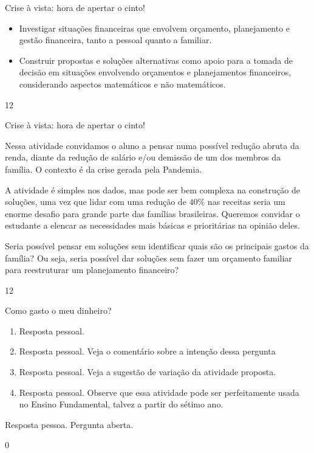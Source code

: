 \begin{objectives}{Crise à vista: hora de apertar o cinto!}
{
\begin{itemize}
\item Investigar situações financeiras que envolvem orçamento, planejamento e gestão financeira, tanto a pessoal quanto a familiar.
\item Construir propostas e soluções alternativas como apoio para a tomada de decisão em situações envolvendo orçamentos e planejamentos financeiros, considerando aspectos matemáticos e não matemáticos. 
\end{itemize}
}{1}{2}
\end{objectives}
\begin{sugestions}{Crise à vista: hora de apertar o cinto!}
{
Nessa atividade convidamos o aluno a pensar numa possível redução abruta da renda, diante da redução de salário e/ou demissão de um dos membros da família. O contexto é da crise gerada pela Pandemia. 

A atividade é simples nos dados, mas pode ser bem complexa na construção de soluções, uma vez que lidar com uma redução de $40\%$ nas receitas seria um enorme desafio para grande parte das famílias brasileiras. Queremos convidar o estudante a elencar as necessidades mais básicas e prioritárias na opinião deles. 

Seria possível pensar em soluções sem identificar quais são os principais gastos da família? Ou seja, seria possível dar soluções sem fazer um orçamento familiar para reestruturar um planejamento financeiro? 

}{1}{2}
\end{sugestions}
\begin{answer}{Como gasto o meu dinheiro?}
{
\begin{enumerate}
\item Resposta pessoal.
\item Resposta pessoal. Veja o comentário sobre a intenção dessa pergunta
\item Resposta pessoal. Veja a sugestão de variação da atividade proposta.
\item Resposta pessoal. Observe que essa atividade pode ser perfeitamente usada no Ensino Fundamental, talvez a partir do sétimo ano.
\end{enumerate}

Resposta pessoa. Pergunta aberta.
}{0}
\end{answer}

